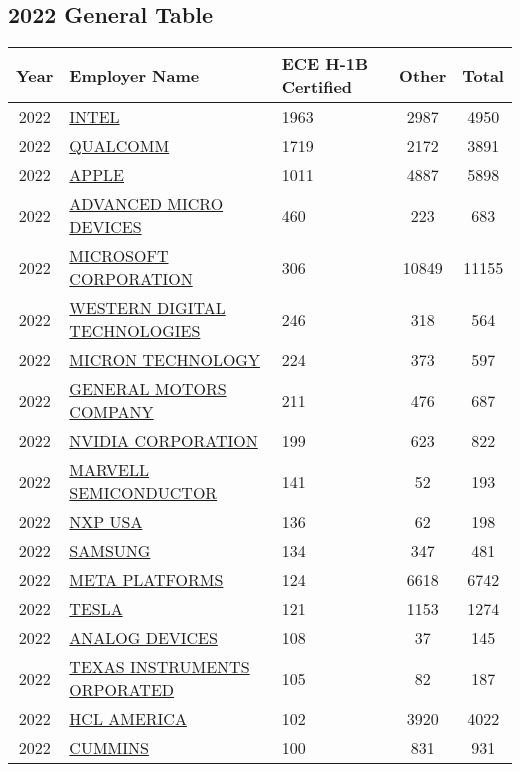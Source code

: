 \documentclass{article}%
\begin{document}
%
\newpage%
\subsection{2022 General Table}%
\label{subsec:2022GeneralTable}%
\begin{longtable}{c|p{20em}|p{5em}|c|c}%
\hline%
Year&Employer Name&ECE \newline%
 H{-}1B \newline%
 Certified&Other&Total\\%
\hline%
2022&\hyperref[subsec:INTEL]{INTEL}&1963&2987&4950\\%
\hline%
2022&\hyperref[subsec:QUALCOMM]{QUALCOMM}&1719&2172&3891\\%
\hline%
2022&\hyperref[subsec:APPLE]{APPLE}&1011&4887&5898\\%
\hline%
2022&\hyperref[subsec:ADVANCEDMICRODEVICES]{ADVANCED MICRO DEVICES}&460&223&683\\%
\hline%
2022&\hyperref[subsec:MICROSOFTCORPORATION]{MICROSOFT CORPORATION}&306&10849&11155\\%
\hline%
2022&\hyperref[subsec:WESTERNDIGITALTECHNOLOGIES]{WESTERN DIGITAL TECHNOLOGIES}&246&318&564\\%
\hline%
2022&\hyperref[subsec:MICRONTECHNOLOGY]{MICRON TECHNOLOGY}&224&373&597\\%
\hline%
2022&\hyperref[subsec:GENERALMOTORSCOMPANY]{GENERAL MOTORS COMPANY}&211&476&687\\%
\hline%
2022&\hyperref[subsec:NVIDIACORPORATION]{NVIDIA CORPORATION}&199&623&822\\%
\hline%
2022&\hyperref[subsec:MARVELLSEMICONDUCTOR]{MARVELL SEMICONDUCTOR}&141&52&193\\%
\hline%
2022&\hyperref[subsec:NXPUSA]{NXP USA}&136&62&198\\%
\hline%
2022&\hyperref[subsec:SAMSUNG]{SAMSUNG}&134&347&481\\%
\hline%
2022&\hyperref[subsec:METAPLATFORMS]{META PLATFORMS}&124&6618&6742\\%
\hline%
2022&\hyperref[subsec:TESLA]{TESLA}&121&1153&1274\\%
\hline%
2022&\hyperref[subsec:ANALOGDEVICES]{ANALOG DEVICES}&108&37&145\\%
\hline%
2022&\hyperref[subsec:TEXASINSTRUMENTSORPORATED]{TEXAS INSTRUMENTS ORPORATED}&105&82&187\\%
\hline%
2022&\hyperref[subsec:HCLAMERICA]{HCL AMERICA}&102&3920&4022\\%
\hline%
2022&\hyperref[subsec:CUMMINS]{CUMMINS}&100&831&931\\%

\end{longtable}
\end{document}

